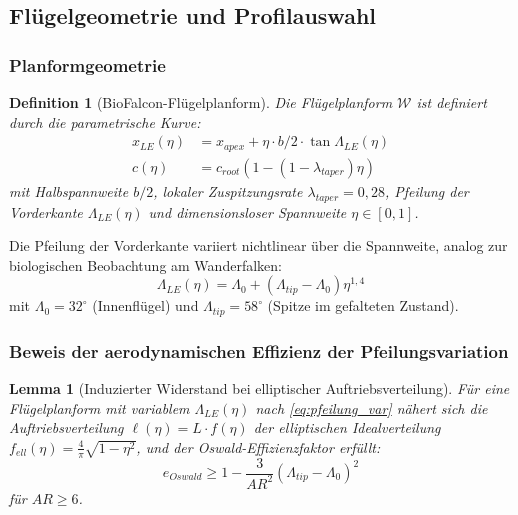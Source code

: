 ﻿\documentclass[12pt,a4paper]{article}
\newtheorem{lemma}[theorem]{Lemma}
\newtheorem{definition}{Definition}[section]
\theoremstyle{remark}
\begin{document}
	\subsection{Flügelgeometrie und Profilauswahl}
	\label{sec:fluegel}
	
	\subsubsection{Planformgeometrie}
	
	\begin{definition}[BioFalcon-Flügelplanform]
		\label{def:planform}
		Die Flügelplanform $\mathcal{W}$ ist definiert durch die parametrische Kurve:
		\begin{align}
			x_{LE}(\eta) &= x_{apex} + \eta \cdot b/2 \cdot \tan\Lambda_{LE}(\eta) \\
			c(\eta)      &= c_{root}\left(1 - (1-\lambda_{taper})\eta\right)
		\end{align}
		mit Halbspannweite $b/2$, lokaler Zuspitzungsrate $\lambda_{taper} = 0{,}28$,
		Pfeilung der Vorderkante $\Lambda_{LE}(\eta)$ und dimensionsloser Spannweite
		$\eta \in [0,1]$.
	\end{definition}
	
	Die Pfeilung der Vorderkante variiert nichtlinear über die Spannweite, analog
	zur biologischen Beobachtung am Wanderfalken:
	\begin{equation}
		\Lambda_{LE}(\eta) = \Lambda_0 + (\Lambda_{tip} - \Lambda_0)\eta^{1{,}4}
		\label{eq:pfeilung_var}
	\end{equation}
	mit $\Lambda_0 = 32^{\circ}$ (Innenflügel) und
	$\Lambda_{tip} = 58^{\circ}$ (Spitze im gefalteten Zustand).
	
	\subsubsection{Beweis der aerodynamischen Effizienz der Pfeilungsvariation}
	
	\begin{lemma}[Induzierter Widerstand bei elliptischer Auftriebsverteilung]
		\label{lem:oswald}
		Für eine Flügelplanform mit variablem $\Lambda_{LE}(\eta)$ nach
		\cref{eq:pfeilung_var} nähert sich die Auftriebsverteilung
		$\ell(\eta) = L \cdot f(\eta)$ der elliptischen Idealverteilung
		$f_{ell}(\eta) = \tfrac{4}{\pi}\sqrt{1-\eta^2}$, und der Oswald-Effizienzfaktor
		erfüllt:
		\begin{equation}
			e_{Oswald} \geq 1 - \frac{3}{AR^2}\left(\Lambda_{tip} - \Lambda_0\right)^2
			\label{eq:oswald_bound}
		\end{equation}
		für $AR \geq 6$.
	\end{lemma}
	
\end{document}

